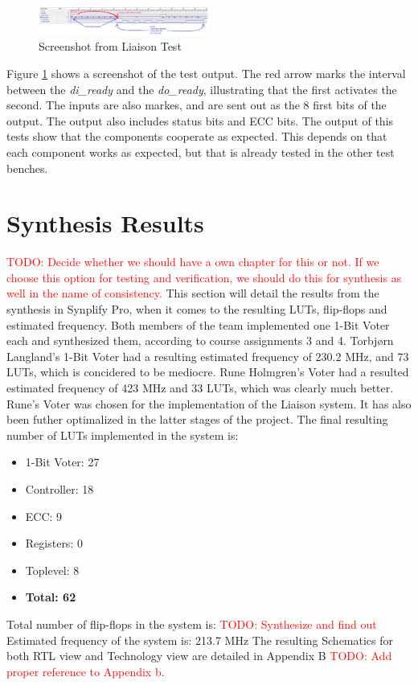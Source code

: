 \documentclass[a4paper]{IEEEtran}
\newcommand\TODO[1]{\textcolor{red}{TODO:#1}}
\newcommand\todo[1]{\TODO{#1}}
\begin{document}
\begin{figure}[h!]
    \centering
    \includegraphics[width=0.5\textwidth]{Figures/Tests/LiaisionTest}
    \caption{Screenshot from Liaison Test}
    \label{fig:LiaisonTests}
\end{figure}

Figure \ref{fig:LiaisonTests} shows a screenshot of the test output.
The red arrow marks the interval between the \textit{di\_ready} and the \textit{do\_ready}, illustrating that the first activates the second.
The inputs are also markes, and are sent out as the 8 first bits of the output.
The output also includes status bits and ECC bits.
The output of this tests show that the components cooperate as expected.
This depends on that each component works as expected, but that is already tested in the other test benches.

\section{Synthesis Results}
\todo{ Decide whether we should have a own chapter for this or not. If we choose this option for testing and verification, we should do this for synthesis as well in the name of consistency. }
This section will detail the results from the synthesis in Synplify Pro, when it comes to the resulting LUTs, flip-flops and estimated frequency.
\break
\break
Both members of the team implemented one 1-Bit Voter each and synthesized them, according to course assignments 3 and 4.
Torbjørn Langland's 1-Bit Voter had a resulting estimated frequency of 230.2 MHz, and 73 LUTs, which is concidered to be mediocre.
Rune Holmgren's Voter had a resulted estimated frequency of 423 MHz and 33 LUTs, which was clearly much better.
Rune's Voter was chosen for the implementation of the Liaison system.
It has also been futher optimalized in the latter stages of the project.
The final resulting number of LUTs implemented in the system is:
\begin{itemize}
    \item 1-Bit Voter: 27
    \item Controller: 18
    \item ECC: 9
    \item Registers: 0
    \item Toplevel: 8
    \item \textbf{Total: 62}
\end{itemize}
Total number of flip-flops in the system is: \todo{ Synthesize and find out}
\break
Estimated frequency of the system is: 213.7 MHz
\break
The resulting Schematics for both RTL view and Technology view are detailed in Appendix B \todo{ Add proper reference to Appendix b}.
\end{document}
